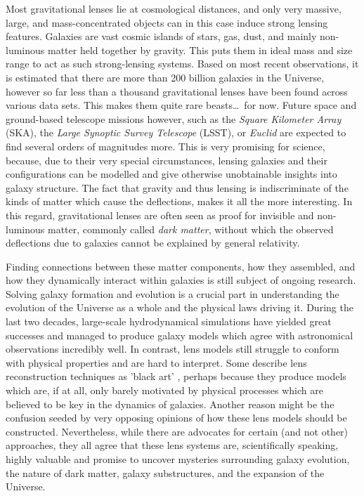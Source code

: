 Most gravitational lenses lie at cosmological distances, and only very massive,
large, and mass-concentrated objects can in this case induce strong lensing
features.  Galaxies are vast cosmic islands of stars, gas, dust, and mainly
non-luminous matter held together by gravity.  This puts them in ideal mass and
size range to act as such strong-lensing systems.  Based on most recent
observations, it is estimated that there are more than 200 billion galaxies in
the Universe, however so far less than a thousand gravitational lenses have been
found across various data sets.  This makes them quite rare beasts\dots\ for
now.  Future space and ground-based telescope missions however, such as the
\textit{Square Kilometer Array} (SKA), the \textit{Large Synoptic Survey
Telescope} (LSST), or \textit{Euclid} are expected to find several orders of
magnitudes more.  This is very promising for science, because, due to their very
special circumstances, lensing galaxies and their configurations can be modelled
and give otherwise unobtainable insights into galaxy structure.  The fact that
gravity and thus lensing is indiscriminate of the kinds of matter which cause
the deflections, makes it all the more interesting.  In this regard,
gravitational lenses are often seen as proof for invisible and non-luminous matter,
commonly called \textit{dark matter}, without which the observed deflections due
to galaxies cannot be explained by general relativity.

Finding connections between these matter components, how they assembled, and how
they dynamically interact within galaxies is still subject of ongoing research.
Solving galaxy formation and evolution is a crucial part in understanding the
evolution of the Universe as a whole and the physical laws driving it.  During
the last two decades, large-scale hydrodynamical simulations have yielded great
successes and managed to produce galaxy models which agree with astronomical
observations incredibly well.  In contrast, lens models still struggle to
conform with physical properties and are hard to interpret.  Some describe lens
reconstruction techniques as 'black art' , perhaps because
they produce models which are, if at all, only barely motivated by physical
processes which are believed to be key in the dynamics of galaxies. Another
reason might be the confusion seeded by very opposing opinions
of how these lens models should be constructed.  Nevertheless, while there are
advocates for certain (and not other) approaches, they all agree that these lens
systems are, scientifically speaking, highly valuable and promise to uncover
mysteries surrounding galaxy evolution, the nature of dark matter, galaxy
substructures, and the expansion of the Universe.

